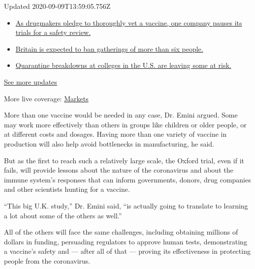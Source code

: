 Updated 2020-09-09T13:59:05.756Z

\begin{itemize}
\tightlist
\item
  \href{https://www.nytimes3xbfgragh.onion/2020/09/09/world/covid-19-coronavirus.html?action=click\&pgtype=Article\&state=default\&region=MAIN_CONTENT_1\&context=storylines_live_updates\#link-70cea8bb}{As
  drugmakers pledge to thoroughly vet a vaccine, one company pauses its
  trials for a safety review.}
\item
  \href{https://www.nytimes3xbfgragh.onion/2020/09/09/world/covid-19-coronavirus.html?action=click\&pgtype=Article\&state=default\&region=MAIN_CONTENT_1\&context=storylines_live_updates\#link-780eaa2f}{Britain
  is expected to ban gatherings of more than six people.}
\item
  \href{https://www.nytimes3xbfgragh.onion/2020/09/09/world/covid-19-coronavirus.html?action=click\&pgtype=Article\&state=default\&region=MAIN_CONTENT_1\&context=storylines_live_updates\#link-11cec4c0}{Quarantine
  breakdowns at colleges in the U.S. are leaving some at risk.}
\end{itemize}

\href{https://www.nytimes3xbfgragh.onion/2020/09/09/world/covid-19-coronavirus.html?action=click\&pgtype=Article\&state=default\&region=MAIN_CONTENT_1\&context=storylines_live_updates}{See
more updates}

More live coverage:
\href{https://www.nytimes3xbfgragh.onion/live/2020/09/09/business/stock-market-today-coronavirus?action=click\&pgtype=Article\&state=default\&region=MAIN_CONTENT_1\&context=storylines_live_updates}{Markets}

More than one vaccine would be needed in any case, Dr. Emini argued.
Some may work more effectively than others in groups like children or
older people, or at different costs and dosages. Having more than one
variety of vaccine in production will also help avoid bottlenecks in
manufacturing, he said.

But as the first to reach such a relatively large scale, the Oxford
trial, even if it fails, will provide lessons about the nature of the
coronavirus and about the immune system's responses that can inform
governments, donors, drug companies and other scientists hunting for a
vaccine.

``This big U.K. study,'' Dr. Emini said, ``is actually going to
translate to learning a lot about some of the others as well.''

All of the others will face the same challenges, including obtaining
millions of dollars in funding, persuading regulators to approve human
tests, demonstrating a vaccine's safety and --- after all of that ---
proving its effectiveness in protecting people from the coronavirus.

